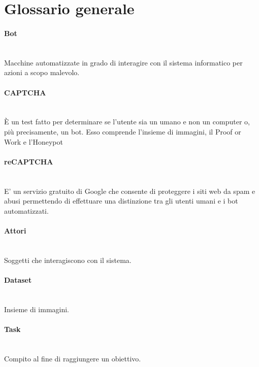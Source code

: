 \section{Glossario generale}

\paragraph{Bot}~\smallskip \\
Macchine automatizzate in grado di interagire con il sistema informatico per azioni a scopo malevolo.

\paragraph{CAPTCHA}~\smallskip \\
È un test fatto per determinare se l'utente sia un umano e non un computer o, più precisamente, un bot.
Esso comprende l'insieme di immagini, il Proof or Work e l'Honeypot

\paragraph{reCAPTCHA}~\smallskip \\
E' un servizio gratuito di Google che consente di proteggere i siti web da spam e abusi permettendo di effettuare una distinzione tra gli utenti umani e i bot automatizzati.

\paragraph{Attori}~\smallskip \\
Soggetti che interagiscono con il sistema.

\paragraph{Dataset}~\smallskip \\
Insieme di immagini.

\paragraph{Task}~\smallskip \\
Compito al fine di raggiungere un obiettivo.

